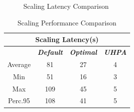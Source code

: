 \documentclass[conference]{IEEEtran}
\begin{document}
\begin{figure}[ht!]
    \caption{Scaling Latency Comparison}
    \label{fig3}
\end{figure}
\begin{table}[ht!]
    \caption{Scaling Performance Comparison}
    \begin{center}
        \begin{tabular}{|c|c|c|c|}
            \hline
            \multicolumn{4}{|c|}{\textbf{Scaling Latency(s)}}                                          \\
            \cline{1-4}
            \hline
            \textbf{} & \textbf{\textit{Default}} & \textbf{\textit{Optimal}} & \textbf{\textit{UHPA}} \\
            \hline
            Average   & 81                        & 27                        & 4                      \\
            \hline
            Min       & 51                        & 16                        & 3                      \\
            \hline
            Max       & 109                       & 45                        & 5                      \\
            \hline
            Perc.95   & 108                       & 41                        & 5                      \\
            \hline
        \end{tabular}
        \label{tab:scaling_performance_comparison}
    \end{center}
\end{table}
\end{document}
